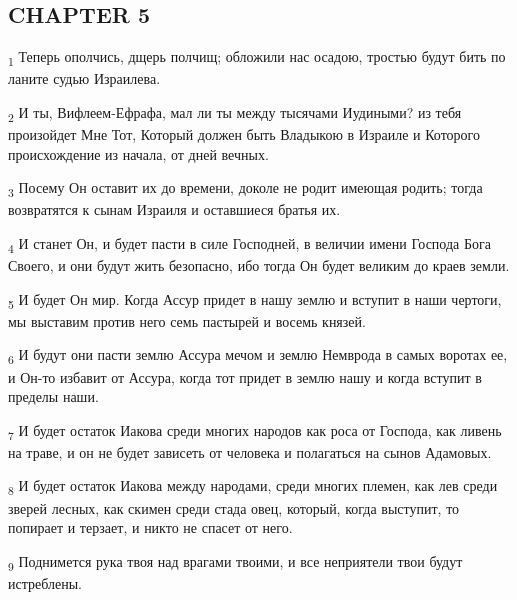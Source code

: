 \subsection{CHAPTER 5}
\begin{tcolorbox}
\textsubscript{1} Теперь ополчись, дщерь полчищ; обложили нас осадою, тростью будут бить по ланите судью Израилева.
\end{tcolorbox}
\begin{tcolorbox}
\textsubscript{2} И ты, Вифлеем-Ефрафа, мал ли ты между тысячами Иудиными? из тебя произойдет Мне Тот, Который должен быть Владыкою в Израиле и Которого происхождение из начала, от дней вечных.
\end{tcolorbox}
\begin{tcolorbox}
\textsubscript{3} Посему Он оставит их до времени, доколе не родит имеющая родить; тогда возвратятся к сынам Израиля и оставшиеся братья их.
\end{tcolorbox}
\begin{tcolorbox}
\textsubscript{4} И станет Он, и будет пасти в силе Господней, в величии имени Господа Бога Своего, и они будут жить безопасно, ибо тогда Он будет великим до краев земли.
\end{tcolorbox}
\begin{tcolorbox}
\textsubscript{5} И будет Он мир. Когда Ассур придет в нашу землю и вступит в наши чертоги, мы выставим против него семь пастырей и восемь князей.
\end{tcolorbox}
\begin{tcolorbox}
\textsubscript{6} И будут они пасти землю Ассура мечом и землю Немврода в самых воротах ее, и Он-то избавит от Ассура, когда тот придет в землю нашу и когда вступит в пределы наши.
\end{tcolorbox}
\begin{tcolorbox}
\textsubscript{7} И будет остаток Иакова среди многих народов как роса от Господа, как ливень на траве, и он не будет зависеть от человека и полагаться на сынов Адамовых.
\end{tcolorbox}
\begin{tcolorbox}
\textsubscript{8} И будет остаток Иакова между народами, среди многих племен, как лев среди зверей лесных, как скимен среди стада овец, который, когда выступит, то попирает и терзает, и никто не спасет от него.
\end{tcolorbox}
\begin{tcolorbox}
\textsubscript{9} Поднимется рука твоя над врагами твоими, и все неприятели твои будут истреблены.
\end{tcolorbox}
